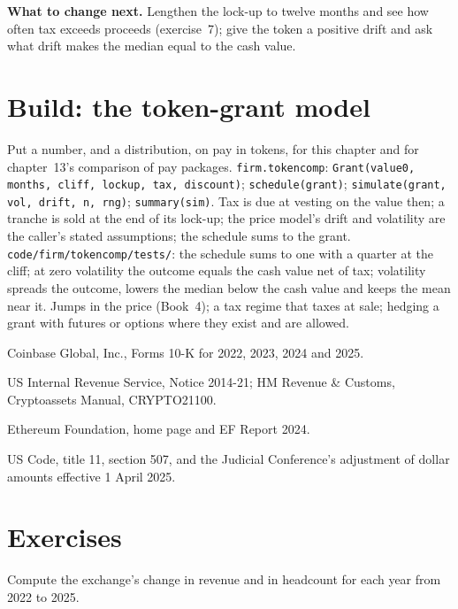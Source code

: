 \textbf{What to change next.} Lengthen the lock-up to twelve months and see how often tax exceeds proceeds
(exercise~7); give the token a positive drift and ask what drift makes the median equal to the cash value.

\section{Build: the token-grant model}\label{bld:in:crypto-native-firms:tokencomp}

\begin{build}
 Put a number, and a distribution, on pay in tokens, for this chapter and for chapter~13's comparison of
pay packages.
 \texttt{firm.tokencomp}: \texttt{Grant(value0, months, cliff, lockup, tax, discount)};
\texttt{schedule(grant)}; \texttt{simulate(grant, vol, drift, n, rng)}; \texttt{summary(sim)}.
 Tax is due at vesting on the value then; a tranche is sold at the end of its lock-up; the price model's
drift and volatility are the caller's stated assumptions; the schedule sums to the grant.
 \texttt{code/firm/tokencomp/tests/}: the schedule sums to one with a quarter at the cliff; at
zero volatility the outcome equals the cash value net of tax; volatility spreads the outcome, lowers the median below
the cash value and keeps the mean near it.
 Jumps in the price (Book~4); a tax regime that taxes at sale; hedging a grant with futures or options
where they exist and are allowed.
\end{build}

\begin{omsources}
\item Coinbase Global, Inc., Forms 10-K for 2022, 2023, 2024 and 2025.
\item US Internal Revenue Service, Notice 2014-21; HM Revenue \& Customs, Cryptoassets Manual, CRYPTO21100.
\item Ethereum Foundation, home page and EF Report 2024.
\item US Code, title 11, section 507, and the Judicial Conference's adjustment of dollar amounts effective 1 April 2025.
\end{omsources}

\section{Exercises}

\begin{exercise}[$\star$]\label{exo:in:crypto-native-firms:1}
Compute the exchange's change in revenue and in headcount for each year from 2022 to 2025.
\end{exercise}

